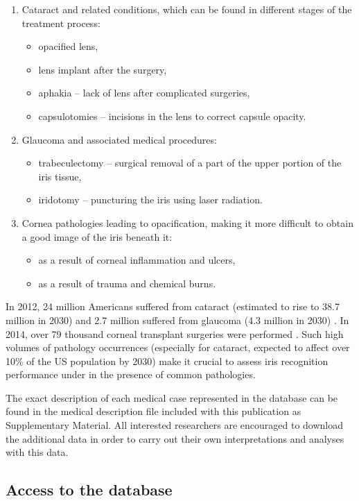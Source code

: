 \documentclass[article,12pt]{elsarticle}
\begin{document}
\begin{enumerate}
	\item Cataract and related conditions, which can be found in different stages of the treatment process:
	\begin{itemize}
		\item opacified lens,
		\item lens implant after the surgery,
		\item aphakia -- lack of lens after complicated surgeries,
		\item capsulotomies -- incisions in the lens to correct capsule opacity.
	\end{itemize}
	\item Glaucoma and associated medical procedures:
	\begin{itemize}
		\item trabeculectomy -- surgical removal of a part of the upper portion of the iris tissue, 
		\item iridotomy -- puncturing the iris using laser radiation.
	\end{itemize} 
	\item Cornea pathologies leading to opacification, making it more difficult to obtain a good image of the iris beneath it:
	\begin{itemize}
		\item as a result of corneal inflammation and ulcers,
		\item as a result of trauma and chemical burns.
	\end{itemize}
\end{enumerate} 

In 2012, 24 million Americans suffered from cataract (estimated to rise to 38.7 million in 2030) and 2.7 million suffered from glaucoma (4.3 million in 2030) \cite{VisionProblemsReport}. In 2014, over 79 thousand corneal transplant surgeries were performed \cite{CorneaReport}. Such high volumes of pathology occurrences (especially for cataract, expected to affect over 10\% of the US population by 2030) make it crucial to assess iris recognition performance under in the presence of common pathologies.

The exact description of each medical case represented in the database can be found in the medical description file included with this publication as Supplementary Material. All interested researchers are encouraged to download the additional data in order to carry out their own interpretations and analyses with this data.

\subsection{Access to the database} 
\end{document}
